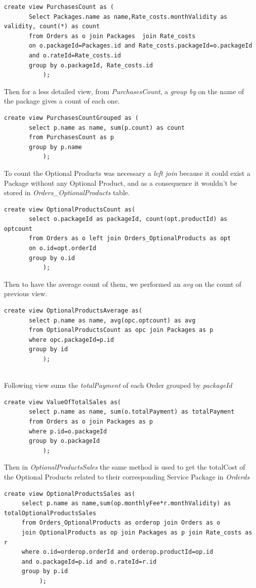 \documentclass{article}
\begin{document}
\begin{lstlisting}
create view PurchasesCount as (
       Select Packages.name as name,Rate_costs.monthValidity as validity, count(*) as count
       from Orders as o join Packages  join Rate_costs
       on o.packageId=Packages.id and Rate_costs.packageId=o.packageId 
       and o.rateId=Rate_costs.id
       group by o.packageId, Rate_costs.id
           );
\end{lstlisting}
Then for a less detailed view, from \emph{PurchasesCount}, a \emph{group by} on the name of the package gives a count of each one.
\begin{lstlisting}
create view PurchasesCountGrouped as (
       select p.name as name, sum(p.count) as count
       from PurchasesCount as p
       group by p.name
           );

\end{lstlisting}

To count the Optional Products was necessary a \emph{left join} because it could exist a Package without any Optional Product, and as a consequence it wouldn't be stored in \emph{Orders_OptionalProducts} table.
\begin{lstlisting}
create view OptionalProductsCount as(
       select o.packageId as packageId, count(opt.productId) as optcount
       from Orders as o left join Orders_OptionalProducts as opt
       on o.id=opt.orderId
       group by o.id
           );
\end{lstlisting}
Then to have the average count of them, we performed an \emph{avg} on the count of previous view.
\begin{lstlisting}
create view OptionalProductsAverage as(
       select p.name as name, avg(opc.optcount) as avg
       from OptionalProductsCount as opc join Packages as p
       where opc.packageId=p.id
       group by id
           );
           
\end{lstlisting}

Following view sums the \emph{totalPayment} of each Order grouped by \emph{packageId}
\begin{lstlisting}
create view ValueOfTotalSales as(
       select p.name as name, sum(o.totalPayment) as totalPayment
       from Orders as o join Packages as p
       where p.id=o.packageId
       group by o.packageId
           );
\end{lstlisting}
Then in \emph{OptionalProductsSales} the same method is used to get the totalCost of the Optional Products related to their corresponding Service Package in \emph{Orderds}
\begin{lstlisting}
create view OptionalProductsSales as(
     select p.name as name,sum(op.monthlyFee*r.monthValidity) as totalOptionalProductsSales
     from Orders_OptionalProducts as orderop join Orders as o
     join OptionalProducts as op join Packages as p join Rate_costs as r
     where o.id=orderop.orderId and orderop.productId=op.id 
     and o.packageId=p.id and o.rateId=r.id
     group by p.id
          );
\end{lstlisting}
\end{document}
